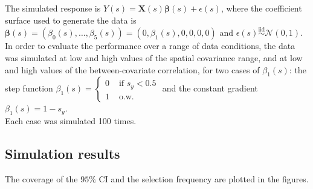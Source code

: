 \documentclass[authoryear, review, 11pt]{elsarticle}
\begin{document}
		The simulated response is $Y(s) = \bm{X}(s) \bm{\beta}(s) + \epsilon(s)$, where the coefficient surface used to generate the data is $\bm{\beta}(s) = \left( \beta_0(s), \dots, \beta_5(s) \right) = \left( 0, \beta_1(s), 0, 0, 0, 0 \right)$ and $\epsilon(s) \overset{\mbox{iid}}{\sim} \mathcal{N} \left( 0, 1 \right)$.\\
		
		In order to evaluate the performance over a range of data conditions, the data was simulated at low and high values of the spatial covariance range, and at low and high values of the between-covariate correlation, for two cases of $\beta_1(s)$: the step function $\beta_1(s) = \begin{cases} 0 &\mbox{ if } s_y<0.5 \\ 1 &\mbox{ o.w.} \end{cases}$ and the constant gradient $\beta_1(s) = 1-s_y$.\\
	
		Each case was simulated 100 times.\\
	
	\subsection{Simulation results}
		The coverage of the $95\%$ CI and the selection frequency are plotted in the figures.\\
		
\end{document}
